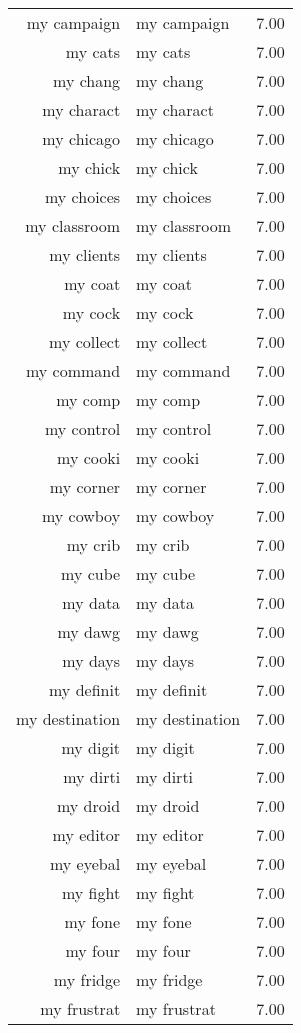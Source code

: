 \begin{table}[ht]
\begin{tabular}{rlr}
  my campaign & my campaign & 7.00 \\ 
  my cats & my cats & 7.00 \\ 
  my chang & my chang & 7.00 \\ 
  my charact & my charact & 7.00 \\ 
  my chicago & my chicago & 7.00 \\ 
  my chick & my chick & 7.00 \\ 
  my choices & my choices & 7.00 \\ 
  my classroom & my classroom & 7.00 \\ 
  my clients & my clients & 7.00 \\ 
  my coat & my coat & 7.00 \\ 
  my cock & my cock & 7.00 \\ 
  my collect & my collect & 7.00 \\ 
  my command & my command & 7.00 \\ 
  my comp & my comp & 7.00 \\ 
  my control & my control & 7.00 \\ 
  my cooki & my cooki & 7.00 \\ 
  my corner & my corner & 7.00 \\ 
  my cowboy & my cowboy & 7.00 \\ 
  my crib & my crib & 7.00 \\ 
  my cube & my cube & 7.00 \\ 
  my data & my data & 7.00 \\ 
  my dawg & my dawg & 7.00 \\ 
  my days & my days & 7.00 \\ 
  my definit & my definit & 7.00 \\ 
  my destination & my destination & 7.00 \\ 
  my digit & my digit & 7.00 \\ 
  my dirti & my dirti & 7.00 \\ 
  my droid & my droid & 7.00 \\ 
  my editor & my editor & 7.00 \\ 
  my eyebal & my eyebal & 7.00 \\ 
  my fight & my fight & 7.00 \\ 
  my fone & my fone & 7.00 \\ 
  my four & my four & 7.00 \\ 
  my fridge & my fridge & 7.00 \\ 
  my frustrat & my frustrat & 7.00 \\ 

\end{tabular}
\end{table}
